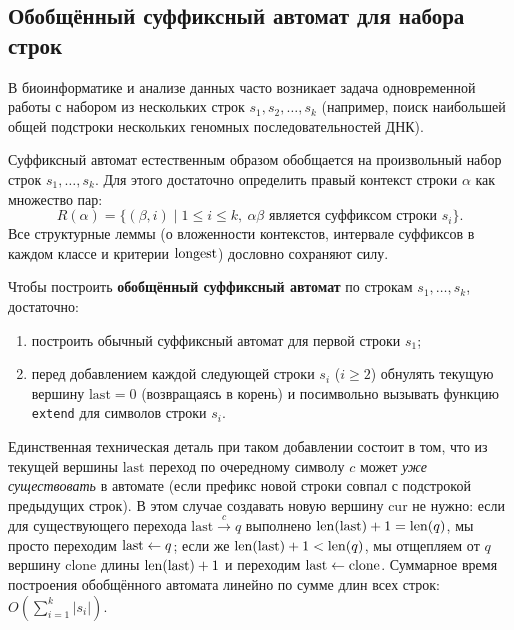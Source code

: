 \subsection{Обобщённый суффиксный автомат для набора строк}

В биоинформатике и анализе данных часто возникает задача одновременной работы с набором из нескольких строк $s_1, s_2, \dots, s_k$ (например, поиск наибольшей общей подстроки нескольких геномных последовательностей ДНК).

Суффиксный автомат естественным образом обобщается на произвольный набор строк $s_1, \dots, s_k$. Для этого достаточно определить правый контекст строки $\alpha$ как множество пар:
\[
    R(\alpha) = \bigl\{(\beta, i) \;\big|\; 1 \le i \le k,\ \alpha\beta \text{ является суффиксом строки } s_i\bigr\}.
\]
Все структурные леммы (о вложенности контекстов, интервале суффиксов в каждом классе и критерии $\operatorname{longest}$) дословно сохраняют силу.

Чтобы построить \textbf{обобщённый суффиксный автомат} по строкам $s_1, \dots, s_k$, достаточно:
\begin{enumerate}
    \item построить обычный суффиксный автомат для первой строки $s_1$;
    \item перед добавлением каждой следующей строки $s_i$ ($i \ge 2$) обнулять текущую вершину $\text{last} = 0$ (возвращаясь в корень) и посимвольно вызывать функцию \texttt{extend} для символов строки $s_i$.
\end{enumerate}
Единственная техническая деталь при таком добавлении состоит в том, что из текущей вершины $\text{last}$ переход по очередному символу $c$ может \emph{уже существовать} в автомате (если префикс новой строки совпал с подстрокой предыдущих строк). В этом случае создавать новую вершину $\text{cur}$ не нужно: если для существующего перехода $\text{last} \xrightarrow{c} q$ выполнено $\operatorname{len}(\text{last}) + 1 = \operatorname{len}(q)$, мы просто переходим $\text{last} \leftarrow q$; если же $\operatorname{len}(\text{last}) + 1 < \operatorname{len}(q)$, мы отщепляем от $q$ вершину $\text{clone}$ длины $\operatorname{len}(\text{last}) + 1$ и переходим $\text{last} \leftarrow \text{clone}$. Суммарное время построения обобщённого автомата линейно по сумме длин всех строк: $O\!\left(\sum_{i=1}^k |s_i|\right)$.
